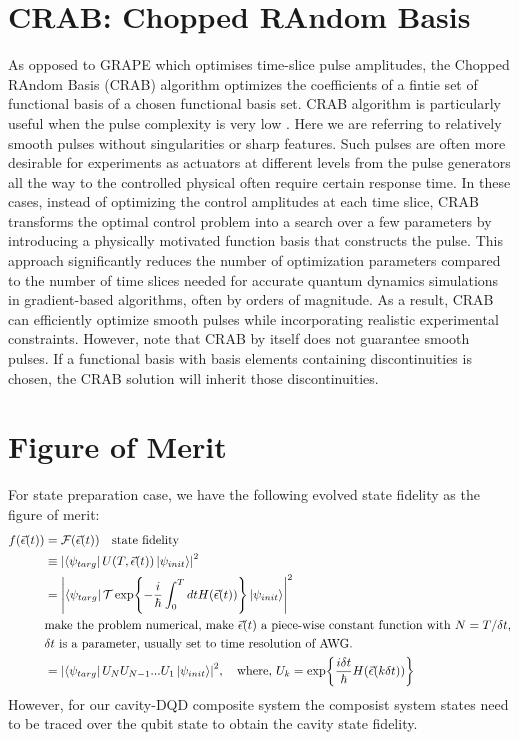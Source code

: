 \documentclass[12pt]{report}
\begin{document}
\section{CRAB: Chopped RAndom Basis}\label{sec:CRAB}
As opposed to GRAPE which optimises time-slice pulse amplitudes, the Chopped RAndom Basis (CRAB) algorithm optimizes the coefficients of a fintie set of functional basis of a chosen functional basis set. 
CRAB algorithm is particularly useful when the pulse complexity is very low \cite{PhysRevLett.106.190501, PhysRevA.84.022326}.
Here we are referring to relatively smooth pulses without singularities or sharp features. 
Such pulses are often more desirable for experiments as actuators at different levels from the pulse generators all the way to the controlled physical often require certain response time. 
In these cases, instead of optimizing the control amplitudes at each time slice, CRAB transforms the optimal control problem into a search over a few parameters by introducing a physically motivated function basis that constructs the pulse. 
This approach significantly reduces the number of optimization parameters compared to the number of time slices needed for accurate quantum dynamics simulations in gradient-based algorithms, often by orders of magnitude. 
As a result, CRAB can efficiently optimize smooth pulses while incorporating realistic experimental constraints.
However, note that CRAB by itself does not guarantee smooth pulses. If a functional basis with basis elements containing discontinuities is chosen, the CRAB solution will inherit those discontinuities.
\section{Figure of Merit}\label{sec:figure_of_merit}
For state preparation case, we have the following evolved state fidelity as the figure of merit:
\begin{align*}
    f(\vec{\epsilon}(t)) &= \mathcal{F}(\vec{\epsilon}(t)) \quad \text{state fidelity}\\
    &\equiv \abs{\bra{\psi_{targ}} U(T,\vec{\epsilon}(t)) \ket{\psi_{init}}}^2 \\
    &= \abs{\bra{\psi_{targ}} 
        \mathcal{T}\exp{-\frac{i}{\hbar}\int_0^T dt H(\vec{\epsilon}(t))}
        \ket{\psi_{init}}}^2 \\
    &\text{make the problem numerical, make $\vec{\epsilon}(t)$ a piece-wise constant function with $N=T/\delta t$,} \\
    &\text{$\delta t$ is a parameter, usually set to time resolution of AWG.} \\
    &= \abs{\bra{\psi_{targ}} 
        U_NU_{N-1}...U_1
        \ket{\psi_{init}}}^2, \quad \text{where, } U_k=\exp{\frac{i\delta t}{\hbar}H(\vec{\epsilon}(k\delta t))} \\
\end{align*}
However, for our cavity-DQD composite system the composist system states need to be traced over the qubit state to obtain the cavity state fidelity. 
\end{document}
